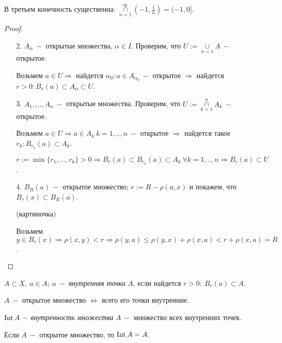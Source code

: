 \begin{remark}
    В третьем конечность существенна: $\cap\limits_{n=1}^\infty (-1,\frac{1}{n})=(-1,0]$.
\end{remark}

\begin{proof}
    \begin{enumerate}
        \item[]
        \item[2.] $A_\alpha\ -$ открытые множества, $\alpha\in I$. Проверим, что $U:=\cup\limits_{n=1}A\ -$ открытое.

        Возьмем $a\in U\Rightarrow$ найдется $\alpha_0:a\in A_{\alpha_0}\ -$ открытое $\Rightarrow $ найдется $r>0:B_r(a)\subset A_\alpha \subset U$.

        \item[3.] $A_1,...,A_n\ -$ открытые множества. Проверим, что $U:=\cap\limits_{k=1}^n A_k\ -$ открытое.

        Возьмем $a\in U\Rightarrow a\in A_k\ k=1,..,n\ -$ открытое $\Rightarrow $ найдется такое $r_k:B_{r_k}(a)\subset A_k$.

        $r:=\min\{r_1,...,r_k\}>0\Rightarrow B_r(a)\subset B_{r_k}(a)\subset A_k\ \forall k =1,..,n\Rightarrow B_r(a)\subset U$.

        \item[4.] $B_R(a)\ -$ открытое множество; $r:=R-\rho(a,x)$ и покажем, что $B_r(x)\subset B_R(a)$.

        (картиночка)

        Возьмем $y\in B_r(x)\Rightarrow \rho(x,y)<r\Rightarrow \rho(y,a)\leq \rho(y,x)+\rho(x,a)<r+\rho(x,a)=R$.
    \end{enumerate}
\end{proof}

\begin{definition}
    $A\subset X,\ a\in A;\ a\ -$ \textit{внутренняя точка} $A$, если найдется $r>0:\ B_r(a)\subset A$.
\end{definition}

\begin{remark}
    $A\ -$ открытое множество $\Leftrightarrow$ всего его точки внутренние.
\end{remark}

\begin{definition}
    $\operatorname{Int} A\ -$ \textit{внутренность множества} $A\ -$ множество всех внутренних точек.
\end{definition}

\begin{remark}
    Если $A\ -$ открытое множество, то $\operatorname{Int} A=A$.
\end{remark}


